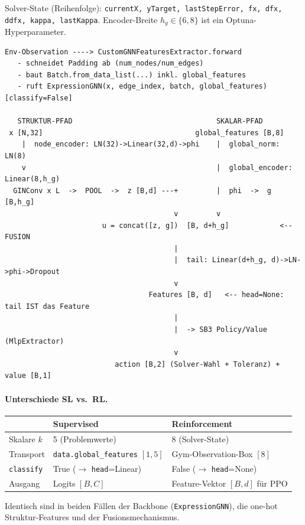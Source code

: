 \documentclass[11pt,a4paper]{article}
\newcommand{\code}[1]{\texttt{#1}}
\begin{document}
Solver-State (Reihenfolge): \code{currentX, yTarget, lastStepError, fx, dfx, ddfx,
kappa, lastKappa}. Encoder-Breite $h_g \in \{6,8\}$ ist ein Optuna-Hyperparameter.

\begin{lstlisting}[style=ascii]
 Env-Observation ----> CustomGNNFeaturesExtractor.forward
   - schneidet Padding ab (num_nodes/num_edges)
   - baut Batch.from_data_list(...) inkl. global_features
   - ruft ExpressionGNN(x, edge_index, batch, global_features)   [classify=False]

   STRUKTUR-PFAD                                  SKALAR-PFAD
 x [N,32]                                    global_features [B,8]
    |  node_encoder: LN(32)->Linear(32,d)->phi    |  global_norm: LN(8)
    v                                             |  global_encoder: Linear(8,h_g)
  GINConv x L  ->  POOL  ->  z [B,d] ---+         |  phi  ->  g [B,h_g]
                                        v         v
                       u = concat([z, g])  [B, d+h_g]            <-- FUSION
                                        |
                                        |  tail: Linear(d+h_g, d)->LN->phi->Dropout
                                        v
                                  Features [B, d]   <-- head=None: tail IST das Feature
                                        |
                                        |  -> SB3 Policy/Value (MlpExtractor)
                                        v
                          action [B,2] (Solver-Wahl + Toleranz) + value [B,1]
\end{lstlisting}

\paragraph{Unterschiede SL vs.\ RL.}
\begin{center}\small
\begin{tabular}{@{}lll@{}}
\toprule
 & \textbf{Supervised} & \textbf{Reinforcement} \\
\midrule
Skalare $k$ & 5 (Problemwerte) & 8 (Solver-State) \\
Transport & \code{data.global\_features} $[1,5]$ & Gym-Observation-Box $[8]$ \\
\code{classify} & True ($\rightarrow$ \code{head}=Linear) & False ($\rightarrow$ \code{head}=None) \\
Ausgang & Logits $[B,C]$ & Feature-Vektor $[B,d]$ für PPO \\
\bottomrule
\end{tabular}
\end{center}
Identisch sind in beiden Fällen der Backbone (\code{ExpressionGNN}), die one-hot
Struktur-Features und der Fusionsmechanismus.
\end{document}
